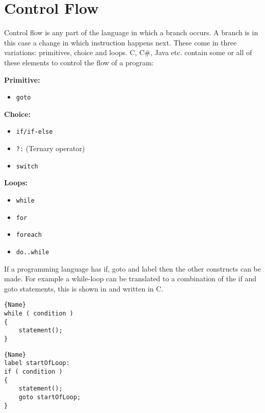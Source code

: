 \section{Control Flow}\label{subsec:control-flow}
Control flow is any part of the language in which a branch occurs. 
A branch is in this case a change in which instruction happens next. 
These come in three variations: primitives, choice and loops.
C, C\#, Java etc. contain some or all of these elements to control the flow of a program:

\textbf{Primitive:}
\begin{itemize}[noitemsep,topsep=-5pt] %
    \item \texttt{goto}
\end{itemize}

\textbf{Choice:}
\begin{itemize}[noitemsep,topsep=-5pt] %
    \item \texttt{if/if-else}
    \item \texttt{?:} (Ternary operator)
    \item \texttt{switch}
\end{itemize}

\textbf{Loops:}
\begin{itemize}[noitemsep,topsep=-5pt] %
    \item \texttt{while}
    \item \texttt{for}
    \item \texttt{foreach}
    \item \texttt{do..while}
\end{itemize}

If a programming language has if, goto and label then the other constructs can be made.
For example a while-loop can be translated to a combination of the if and goto statements, this is shown in  and  written in C. 

\noindent\begin{minipage}{.45\textwidth}
\begin{lstlisting}[caption=Loop made with while.,frame=tlrb, label=ifgotowhile1, numbers=none]{Name}
while ( condition )
{
    statement();
}
\end{lstlisting}
\end{minipage}\hfill
\begin{minipage}{.45\textwidth}
\begin{lstlisting}[caption=The same loop with if and goto.,frame=tlrb, label=ifgotowhile2, numbers=none]{Name}
label startOfLoop:
if ( condition )
{
    statement();
    goto startOfLoop;
}
\end{lstlisting}
\end{minipage}

